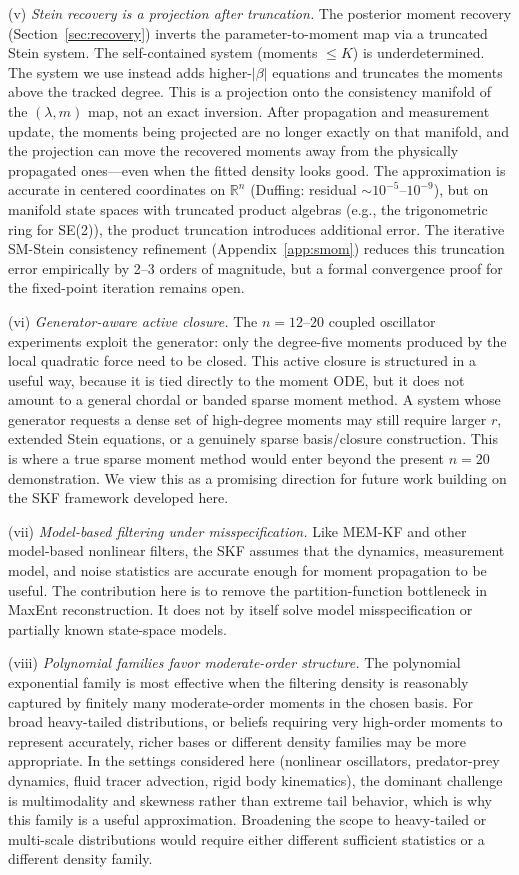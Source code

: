 \documentclass{article}
\newcommand{\R}{\mathbb{R}}
\theoremstyle{definition}
\begin{document}
(v) \emph{Stein recovery is a projection after truncation.}
The posterior moment recovery (Section~\ref{sec:recovery})
inverts the parameter-to-moment map via a truncated Stein system.
The self-contained system (moments $\le K$) is underdetermined.
The system we use instead adds higher-$|\beta|$ equations and
truncates the moments above the tracked degree.
This is a projection onto the consistency manifold of
the $(\lambda, m)$ map, not an exact inversion.
After propagation and measurement update, the moments being
projected are no longer exactly on that manifold, and the
projection can move the recovered moments away from the
physically propagated ones---even when the fitted density
looks good.
The approximation is accurate in centered coordinates on $\R^n$
(Duffing: residual $\sim 10^{-5}$--$10^{-9}$), but on manifold
state spaces with truncated product algebras (e.g., the
trigonometric ring for SE(2)), the product truncation introduces
additional error.
The iterative SM-Stein consistency refinement
(Appendix~\ref{app:smom}) reduces this truncation error
empirically by 2--3 orders of magnitude, but a formal
convergence proof for the fixed-point iteration remains open.

(vi) \emph{Generator-aware active closure.}
The $n{=}12$--$20$ coupled oscillator experiments exploit the generator:
only the degree-five moments produced by the local quadratic force
need to be closed. This active closure is structured in a useful way,
because it is tied directly to the moment ODE, but it does not amount
to a general chordal or banded sparse moment method. A system whose
generator requests a dense set of high-degree moments may still require
larger $r$, extended Stein equations, or a genuinely sparse
basis/closure construction. This is where a true sparse moment method
would enter beyond the present $n{=}20$ demonstration. We view this as
a promising direction for future work building on the SKF framework
developed here.

(vii) \emph{Model-based filtering under misspecification.}
Like MEM-KF and other model-based nonlinear filters, the SKF assumes
that the dynamics, measurement model, and noise statistics are accurate
enough for moment propagation to be useful. The contribution here is to
remove the partition-function bottleneck in MaxEnt reconstruction. It
does not by itself solve model misspecification or partially known
state-space models.

(viii) \emph{Polynomial families favor moderate-order structure.}
The polynomial exponential family is most effective when the filtering
density is reasonably captured by finitely many moderate-order moments
in the chosen basis.
For broad heavy-tailed distributions, or beliefs requiring very high-order
moments to represent accurately, richer bases or different density
families may be more appropriate.
In the settings considered here (nonlinear oscillators, predator-prey
dynamics, fluid tracer advection, rigid body kinematics), the dominant
challenge is multimodality and skewness rather than extreme tail behavior,
which is why this family is a useful approximation. Broadening the
scope to heavy-tailed or multi-scale distributions would require either
different sufficient statistics or a different density family.
\end{document}
